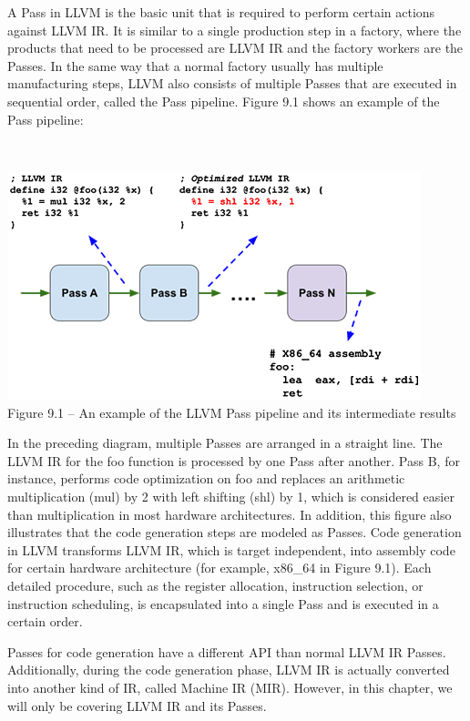 
A Pass in LLVM is the basic unit that is required to perform certain actions against LLVM IR. It is similar to a single production step in a factory, where the products that need to be processed are LLVM IR and the factory workers are the Passes. In the same way that a normal factory usually has multiple manufacturing steps, LLVM also consists of multiple Passes that are executed in sequential order, called the Pass pipeline. Figure 9.1 shows an example of the Pass pipeline:

\hspace*{\fill} \\ %
\begin{center}
\includegraphics[width=0.9\textwidth]{content/3/chapter9/images/1.png}\\
Figure 9.1 – An example of the LLVM Pass pipeline and its intermediate results
\end{center}

In the preceding diagram, multiple Passes are arranged in a straight line. The LLVM IR for the foo function is processed by one Pass after another. Pass B, for instance, performs code optimization on foo and replaces an arithmetic multiplication (mul) by 2 with left shifting (shl) by 1, which is considered easier than multiplication in most hardware architectures. In addition, this figure also illustrates that the code generation steps are modeled as Passes. Code generation in LLVM transforms LLVM IR, which is target independent, into assembly code for certain hardware architecture (for example, x86\_64 in Figure 9.1). Each detailed procedure, such as the register allocation, instruction selection, or instruction scheduling, is encapsulated into a single Pass and is executed in a certain order.

\begin{tcolorbox}[colback=blue!5!white,colframe=blue!75!black, fonttitle=\bfseries,title=Code generation Passes]	
\hspace*{0.7cm}Passes for code generation have a different API than normal LLVM IR Passes. Additionally, during the code generation phase, LLVM IR is actually converted into another kind of IR, called Machine IR (MIR). However, in this chapter, we will only be covering LLVM IR and its Passes.
\end{tcolorbox}

